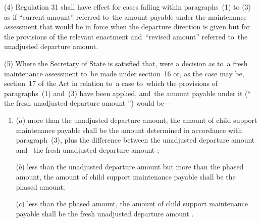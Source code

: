 \documentclass[12pt,a4paper]{article}
\begin{document}
(4) Regulation 31 shall have effect for cases falling within paragraphs~(1) to
(3) as if “current amount” referred to~the amount payable under the maintenance
assessment that would be in force when the departure direction is given but for
the provisions of the relevant enactment and~“revised amount” referred to~the
unadjusted departure amount.

(5) 
Where the Secretary of State is satisfied that, were a decision as to~a fresh maintenance assessment to~be made under section~16 or, as the case may be, section~17 of the Act  %
in relation to~a case to~which the provisions of 
paragraphs~(1) and~(3)  %
have been applied, and~the amount payable under it (“%
the fresh unadjusted departure amount%
”) would be—
\begin{enumerate}\item[]
($a$) more than the unadjusted departure amount, the amount of child support maintenance payable shall be the amount determined in accordance with paragraph~(3), plus the difference between the unadjusted departure amount and~
the fresh unadjusted departure amount%
;

($b$) less than the unadjusted departure amount but more than the phased amount,
the amount of child support maintenance payable shall be the phased amount;

($c$) less than the phased amount, the amount of child support maintenance payable
shall be 
the fresh unadjusted departure amount%
.
\end{enumerate}
\end{document}
